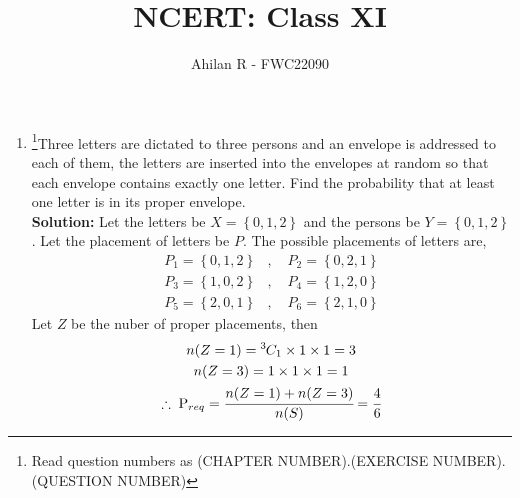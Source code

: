 \documentclass{article}
\providecommand{\cbrak}[1]{\ensuremath{\left\{#1\right\}}}
\newcommand{\solution}{\noindent \textbf{Solution: }}
\newcommand*{\permcomb}[4][0mu]{{{}^{#3}\mkern#1#2_{#4}}}
\newcommand*{\comb}[1][-1mu]{\permcomb[#1]{C}}
\begin{document}
\title{NCERT: Class XI}
\author{\Large Ahilan R - FWC22090}
\date{}

\maketitle

\begin{enumerate}[label=16.\arabic{enumi}.\arabic{enumii}]%
\setcounter{enumi}{3}
\setcounter{enumii}{6}

\item \footnote{Read question numbers as (CHAPTER NUMBER).(EXERCISE NUMBER).(QUESTION NUMBER)}Three letters are dictated to three persons and an envelope is addressed to each of them, the letters are inserted into the envelopes at random so that each envelope contains exactly one letter. Find the probability that at least one letter is in its proper envelope.\\[1ex]
	\solution
		Let the letters be $X = \cbrak{0,1,2}$ and the persons be $Y = \cbrak{0,1,2}$. Let the placement of letters be $P$.
  The possible placements of letters are,
  \begin{align*}
	  P_1 = \cbrak{0,1,2} &, \quad P_2 = \cbrak{0,2,1} \\
	  P_3 = \cbrak{1,0,2} &, \quad P_4 = \cbrak{1,2,0} \\
	  P_5 = \cbrak{2,0,1} &, \quad P_6 = \cbrak{2,1,0} 
  \end{align*}
  Let $Z$ be the nuber of proper placements, then
  \begin{gather}
	  n(Z=1) = \comb{3}{1} \times 1 \times 1 = 3 \\
	  n(Z=3) = 1 \times 1 \times 1 = 1 \\
	  \therefore \; \text{P}_{req} = \cfrac{n(Z=1)+n(Z=3)}{n(S)} = \cfrac{4}{6} %
  \end{gather}
		
\noindent{}

\end{enumerate}
\end{document}
